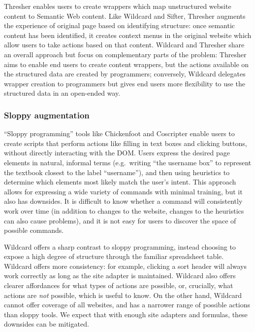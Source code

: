 \documentclass[english,submission]{programming}
\begin{document}
Thresher \autocite{hogue2005} enables users to create wrappers which map
unstructured website content to Semantic Web content. Like Wildcard and
Sifter, Thresher augments the experience of original page based on
identifying structure: once semantic content has been identified, it
creates context menus in the original website which allow users to take
actions based on that content. Wildcard and Thresher share an overall
approach but focus on complementary parts of the problem: Thresher aims
to enable end users to create content wrappers, but the actions
available on the structured data are created by programmers; conversely,
Wildcard delegates wrapper creation to programmers but gives end users
more flexibility to use the structured data in an open-ended way.

\hypertarget{sloppy-augmentation}{%
\subsubsection{Sloppy augmentation}\label{sloppy-augmentation}}

``Sloppy programming'' \autocite{little2010} tools like Chickenfoot
\autocite{bolin2005} and Coscripter \autocite{leshed2008} enable users
to create scripts that perform actions like filling in text boxes and
clicking buttons, without directly interacting with the DOM. Users
express the desired page elements in natural, informal terms
(e.g.~writing ``the username box'' to represent the textbook closest to
the label ``username''), and then using heuristics to determine which
elements most likely match the user's intent. This approach allows for
expressing a wide variety of commands with minimal training, but it also
has downsides. It is difficult to know whether a command will
consistently work over time (in addition to changes to the website,
changes to the heuristics can also cause problems), and it is not easy
for users to discover the space of possible commands.

Wildcard offers a sharp contrast to sloppy programming, instead choosing
to expose a high degree of structure through the familiar spreadsheet
table. Wildcard offers more consistency: for example, clicking a sort
header will always work correctly as long as the site adapter is
maintained. Wildcard also offers clearer affordances for what types of
actions are possible, or, crucially, what actions are \emph{not}
possible, which is useful to know. On the other hand, Wildcard cannot
offer coverage of all websites, and has a narrower range of possible
actions than sloppy tools. We expect that with enough site adapters and
formulas, these downsides can be mitigated.
\end{document}
